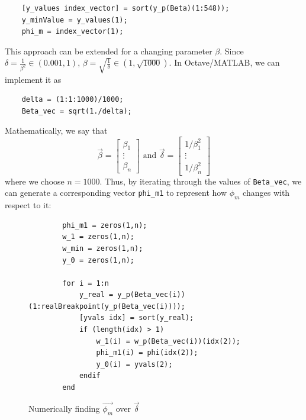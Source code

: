 \documentclass[11pt]{article}
\begin{document}
\begin{verbatim}
    [y_values index_vector] = sort(y_p(Beta)(1:548));
    y_minValue = y_values(1);
    phi_m = index_vector(1);
\end{verbatim}

This approach can be extended for a changing parameter $\beta$. 
Since $\delta=\frac{1}{\beta^2}\in (0.001,1)$, $\beta=\sqrt{\frac{1}{\delta}}\in (1,\sqrt{1000})$.
In Octave/MATLAB, we can implement it as

\begin{verbatim}
    delta = (1:1:1000)/1000;
    Beta_vec = sqrt(1./delta);
\end{verbatim}

Mathematically, we say that 
\begin{equation}
\vec\beta=\begin{bmatrix}\beta_1\\\vdots\\\beta_n\end{bmatrix}\text{ and }\vec{\delta}=\begin{bmatrix}1/\beta_1^2\\\vdots\\1/\beta_n^2\end{bmatrix}
\label{paravectors}
\end{equation}
where we choose $n=1000$.
Thus, by iterating through the values of \verb|Beta_vec|, we can generate a corresponding vector \verb|phi_m1| to represent how $\phi_m$ changes with respect to it:

\begin{figure}[H]
    \begin{verbatim}
        phi_m1 = zeros(1,n);
        w_1 = zeros(1,n);
        w_min = zeros(1,n);
        y_0 = zeros(1,n);
    
        for i = 1:n
            y_real = y_p(Beta_vec(i))(1:realBreakpoint(y_p(Beta_vec(i))));
            [yvals idx] = sort(y_real);
            if (length(idx) > 1)
                w_1(i) = w_p(Beta_vec(i))(idx(2));
                phi_m1(i) = phi(idx(2));
                y_0(i) = yvals(2);
            endif
        end
    \end{verbatim}
    \caption{Numerically finding $\vec{\phi_m}$ over $\vec{\delta}$}\label{loop1}
\end{figure}
\end{document}
